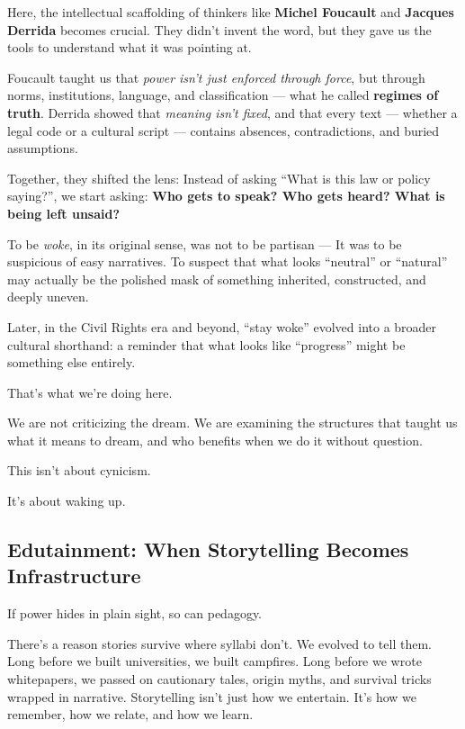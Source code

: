 \medskip

Here, the intellectual scaffolding of thinkers like \textbf{Michel Foucault} and \textbf{Jacques Derrida} becomes crucial.  
They didn’t invent the word, but they gave us the tools to understand what it was pointing at.

Foucault taught us that \textit{power isn’t just enforced through force}, but through norms, institutions, language, and classification — what he called \textbf{regimes of truth}.  
Derrida showed that \textit{meaning isn’t fixed}, and that every text — whether a legal code or a cultural script — contains absences, contradictions, and buried assumptions.

Together, they shifted the lens:  
Instead of asking ``What is this law or policy saying?'', we start asking:  
\textbf{Who gets to speak? Who gets heard? What is being left unsaid?}

To be \textit{woke}, in its original sense, was not to be partisan —  
It was to be suspicious of easy narratives.  
To suspect that what looks ``neutral'' or ``natural'' may actually be the polished mask of something inherited, constructed, and deeply uneven.

Later, in the Civil Rights era and beyond, ``stay woke'' evolved into a broader cultural shorthand:  
a reminder that what looks like ``progress'' might be something else entirely.

That’s what we’re doing here.

We are not criticizing the dream. We are examining the structures that taught us what it means to dream, and who 
benefits when we do it without question.

This isn’t about cynicism.

It’s about waking up.


\subsection{Edutainment: When Storytelling Becomes Infrastructure}

If power hides in plain sight, so can pedagogy.

There’s a reason stories survive where syllabi don’t.
We evolved to tell them. Long before we built universities, we built campfires.
Long before we wrote whitepapers, we passed on cautionary tales, origin myths, and survival tricks wrapped in narrative.
Storytelling isn’t just how we entertain. It’s how we remember, how we relate, and how we learn.

